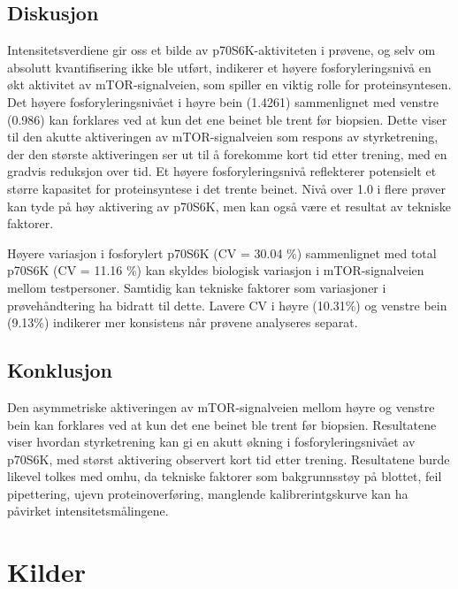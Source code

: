 \documentclass[
  letterpaper,
  DIV=11,
  numbers=noendperiod]{scrreprt}
\begin{document}
\section{Diskusjon}\label{diskusjon-3}

Intensitetsverdiene gir oss et bilde av p70S6K-aktiviteten i prøvene, og
selv om absolutt kvantifisering ikke ble utført, indikerer et høyere
fosforyleringsnivå en økt aktivitet av mTOR-signalveien, som spiller en
viktig rolle for proteinsyntesen. Det høyere fosforyleringsnivået i
høyre bein (1.4261) sammenlignet med venstre (0.986) kan forklares ved
at kun det ene beinet ble trent før biopsien. Dette viser til den akutte
aktiveringen av mTOR-signalveien som respons av styrketrening, der den
største aktiveringen ser ut til å forekomme kort tid etter trening, med
en gradvis reduksjon over tid. Et høyere fosforyleringsnivå reflekterer
potensielt et større kapasitet for proteinsyntese i det trente beinet.
Nivå over 1.0 i flere prøver kan tyde på høy aktivering av p70S6K, men
kan også være et resultat av tekniske faktorer.

Høyere variasjon i fosforylert p70S6K (CV = 30.04 \%) sammenlignet med
total p70S6K (CV = 11.16 \%) kan skyldes biologisk variasjon i
mTOR-signalveien mellom testpersoner. Samtidig kan tekniske faktorer som
variasjoner i prøvehåndtering ha bidratt til dette. Lavere CV i høyre
(10.31\%) og venstre bein (9.13\%) indikerer mer konsistens når prøvene
analyseres separat.

\section{Konklusjon}\label{konklusjon}

Den asymmetriske aktiveringen av mTOR-signalveien mellom høyre og
venstre bein kan forklares ved at kun det ene beinet ble trent før
biopsien. Resultatene viser hvordan styrketrening kan gi en akutt økning
i fosforyleringsnivået av p70S6K, med størst aktivering observert kort
tid etter trening. Resultatene burde likevel tolkes med omhu, da
tekniske faktorer som bakgrunnsstøy på blottet, feil pipettering, ujevn
proteinoverføring, manglende kalibrerintgskurve kan ha påvirket
intensitetsmålingene.


\chapter*{Kilder}\label{kilder}
\end{document}
